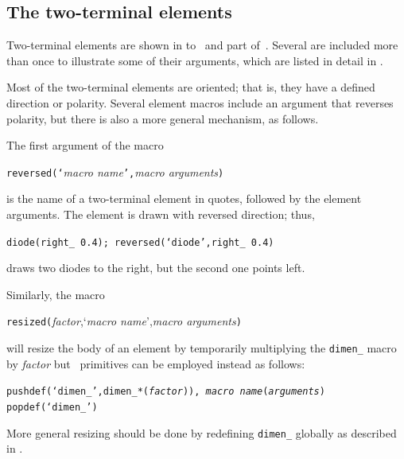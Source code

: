 \subsection{The two-terminal elements\label{Twoterminal:}}
Two-terminal elements are shown in
 to~ and part of~.
Several are included more than once to illustrate
some of their arguments, which are listed in detail in .

Most of the two-terminal elements are oriented; that is, they have
a defined direction or polarity.  Several element macros include an
argument that reverses polarity, but there is also a more general
mechanism, as follows.

The first argument of the macro
\par
{\tt reversed(`}{\sl macro name}{\tt',}{\sl macro arguments}{\tt )}
\par
\noindent
is the name of a two-terminal element in quotes, followed by the
element arguments.  The element is drawn with reversed direction; thus,
\par
{\tt diode(right\_ 0.4); reversed(`diode',right\_ 0.4)}
\par
\noindent
draws two diodes to the right, but the second one points left.

Similarly, the macro
\par
{\tt resized(}{\sl factor},`{\sl macro name}',{\sl macro arguments}{\tt )}
\par
\noindent
will resize the body of an element by temporarily multiplying
the {\tt dimen\_} macro by {\sl factor} but
\Mfour\ primitives can be employed instead as follows:
\par
{\tt pushdef(`dimen\_',dimen\_*({\sl factor})),%
{\sl macro name}({\sl arguments}) popdef(`dimen\_')}
\par
\noindent
More general resizing should be
done by redefining {\tt dimen\_} globally as described in .

